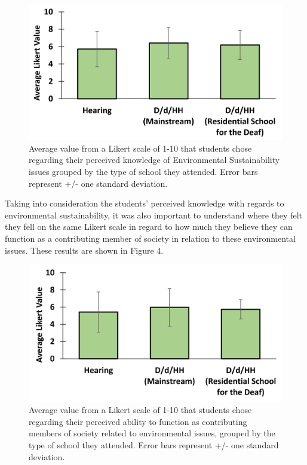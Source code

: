 \documentclass[11.5pt]{sig-alternate} %
\begin{document}
\begin{large}
 \begin{figure}[h]
     \centering
     \includegraphics[width=1\linewidth]{Fig3.jpg}
     \caption{Average value from a Likert scale of 1-10 that students chose regarding their perceived knowledge of Environmental Sustainability issues grouped by the type of school they attended.  Error bars represent +/- one standard deviation.}
 \end{figure}

Taking into consideration the students’ perceived knowledge with regards to environmental sustainability, it was also important to understand where they felt they fell on the same Likert scale in regard to how much they believe they can function as a contributing member of society in relation to these environmental issues. These results are shown in Figure 4.
 
\begin{figure}[h]
    \centering
    \includegraphics[width=1\linewidth]{Fig4.jpg}
    \caption{Average value from a Likert scale of 1-10 that students chose regarding their perceived ability to function as contributing members of society related to environmental issues, grouped by the type of school they attended.  Error bars represent +/- one standard deviation.}
\end{figure}


\end{large}
\end{document}
